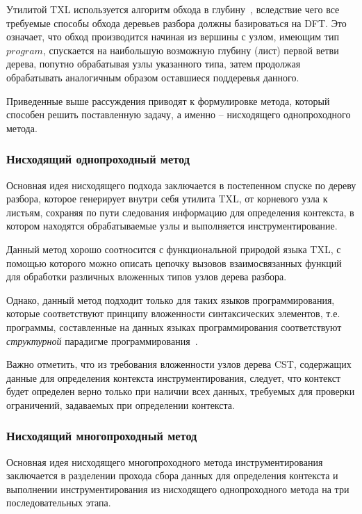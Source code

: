 Утилитой TXL используется алгоритм обхода в глубину~\cite{txl-about}, вследствие чего все требуемые способы обхода деревьев разбора должны базироваться на DFT.
Это означает, что обход производится начиная из вершины с узлом, имеющим тип $program$, спускается на наибольшую возможную глубину (лист) первой ветви дерева, попутно обрабатывая узлы указанного типа, затем продолжая обрабатывать аналогичным образом оставшиеся поддеревья данного.

Приведенные выше рассуждения приводят к формулировке метода, который способен решить поставленную задачу, а именно -- нисходящего однопроходного метода.

\subsubsection{Нисходящий однопроходный метод}


Основная идея нисходящего подхода заключается в постепенном спуске по дереву разбора, которое генерирует внутри себя утилита TXL, от корневого узла к листьям, сохраняя по пути следования информацию для определения контекста, в котором находятся обрабатываемые узлы и выполняется инструментирование.

Данный метод хорошо соотносится с функциональной природой языка TXL, с помощью которого можно описать цепочку вызовов взаимосвязанных функций для обработки различных вложенных типов узлов дерева разбора.

Однако, данный метод подходит только для таких языков программирования, которые соответствуют принципу вложенности синтаксических элементов, т.е. программы, составленные на данных языках программирования соответствуют \textit{структурной} парадигме программирования~\cite{struct-programming}.

Важно отметить, что из требования вложенности узлов дерева CST, содержащих данные для определения контекста инструментирования, следует, что контекст будет определен верно только при наличии всех данных, требуемых для проверки ограничений, задаваемых при определении контекста.

\subsubsection{Нисходящий многопроходный метод}

Основная идея нисходящего многопроходного метода инструментирования заключается в разделении прохода сбора данных для определения контекста и выполнении инструментирования из нисходящего однопроходного метода на три последовательных этапа.

